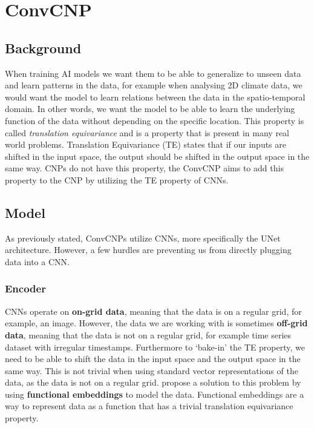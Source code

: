 \documentclass[main.tex]{subfiles}
\begin{document}
\section{ConvCNP}

\subsection{Background}

When training AI models we want them to be able to generalize to unseen data and learn patterns in the data, for example when analysing 2D climate data, we would want the model to learn relations between the data in the spatio-temporal domain. In other words, we want the model to be able to learn the underlying function of the data without depending on the specific location. This property is called \textit{translation equivariance} and is a property that is present in many real world problems. Translation Equivariance (TE) states that if our inputs are shifted in the input space, the output should be shifted in the output space in the same way. CNPs do not have this property, the ConvCNP aims to add this property to the CNP by utilizing the TE property of CNNs.

\subsection{Model}

As previously stated, ConvCNPs \cite{gordon2020convolutional} utilize CNNs, more specifically the UNet architecture. However, a few hurdles are preventing us from directly plugging data into a CNN.

\subsubsection{Encoder}

CNNs operate on \textbf{on-grid data}, meaning that the data is on a regular grid, for example, an image. However, the data we are working with is sometimes \textbf{off-grid data}, meaning that the data is not on a regular grid, for example time series dataset with irregular timestamps. Furthermore to `bake-in' the TE property, we need to be able to shift the data in the input space and the output space in the same way. This is not trivial when using standard vector representations of the data, as the data is not on a regular grid. \cite{gordon2020convolutional} propose a solution to this problem by using \textbf{functional embeddings} to model the data. Functional embeddings are a way to represent data as a function that has a trivial translation equivariance property. 
\end{document}
